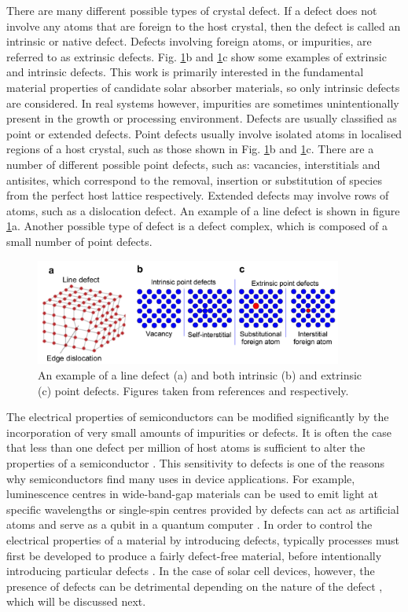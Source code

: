 \documentclass[11pt, twoside]{report}
\begin{document}
There are many different possible types of crystal defect. If a defect does not involve any atoms that are foreign to the host crystal, then the defect is called an intrinsic or native defect. Defects involving foreign atoms, or impurities, are referred to as extrinsic defects. Fig. \ref{defects}b and \ref{defects}c show some examples of extrinsic and intrinsic defects. This work is primarily interested in the fundamental material properties of candidate solar absorber materials, so only intrinsic defects are considered. In real systems however, impurities are sometimes unintentionally present in the growth or processing environment.
Defects are usually classified as point or extended defects. Point defects usually involve isolated atoms in localised regions of a host crystal, such as those shown in Fig. \ref{defects}b and \ref{defects}c. There are a number of different possible point defects, such as: vacancies, interstitials and antisites, which correspond to the removal, insertion or substitution of species from the perfect host lattice respectively. Extended defects may involve rows of atoms, such as a dislocation defect. An example of a line defect is shown in figure \ref{defects}a. Another possible type of defect is a defect complex, which is composed of a small number of point defects.

\begin{figure}[h!]
  \centering
    \includegraphics[width=0.9\textwidth]{figures/defects.png}
    \caption{An example of a line defect (a) and both intrinsic (b) and extrinsic (c) point defects. Figures taken from references  and  respectively.}
  \label{defects}
\end{figure}

The electrical properties of semiconductors can be modified significantly by the incorporation of very small amounts of impurities or defects. It is often the case that less than one defect per million of host atoms is sufficient to alter the properties of a semiconductor \cite{fund_semi}. This sensitivity to defects is one of the reasons why semiconductors find many uses in device applications. For example, luminescence centres in wide-band-gap materials can be used to emit light at specific wavelengths or single-spin centres provided by defects can act as artificial atoms and serve as a qubit in a quantum computer \cite{defects_tutorial}. In order to control the electrical properties of a material by introducing defects, typically processes must first be developed to produce a fairly defect-free material, before intentionally introducing particular defects \cite{fund_semi}. In the case of solar cell devices, however, the presence of defects can be detrimental depending on the nature of the defect \cite{Aron_defect_tolerance}, which will be discussed next. 
\end{document}
